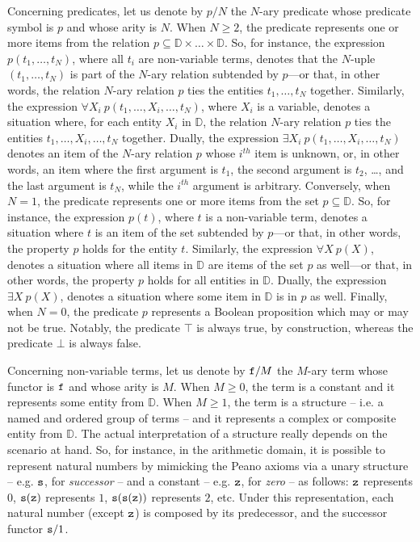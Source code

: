 \documentclass[12pt,a4paper,openright,twoside]{book}
\begin{document}
Concerning predicates, let us denote by $p/N$ the $N$-ary predicate whose predicate symbol is $p$ and whose arity is $N$.
%
%
When $N \geq 2$, the predicate represents one or more items from the relation $p \subseteq \mathbb{D} \times \ldots \times \mathbb{D}$.
%
So, for instance, the expression $p(t_1, \ldots, t_N)$, where all $t_i$ are non-variable terms, denotes that the $N$-uple $(t_1, \ldots, t_N)$ is part of the $N$-ary relation subtended by $p$---or that, in other words, the relation $N$-ary relation $p$ ties the entities $t_1, \ldots, t_N$ together.
%
Similarly, the expression $\forall X_i\ p(t_1, \ldots, X_i, \ldots, t_N)$, where $X_i$ is a variable, denotes a situation where, for each entity $X_i$ in $\mathbb{D}$, the relation $N$-ary relation $p$ ties the entities $t_1, \ldots, X_i, \ldots, t_N$ together.
%
Dually, the expression $\exists X_i\ p(t_1, \ldots, X_i, \ldots, t_N)$ denotes an item of the $N$-ary relation $p$ whose $i^{th}$ item is unknown, or, in other words, an item where the first argument is $t_1$, the second argument is $t_2$, \ldots, and the last argument is $t_N$, while the $i^{th}$ argument is arbitrary.
%
Conversely, when $N = 1$, the predicate represents one or more items from the set $p \subseteq \mathbb{D}$.
%
So, for instance, the expression $p(t)$, where $t$ is a non-variable term, denotes a situation where $t$ is an item of the set subtended by $p$---or that, in other words, the property $p$ holds for the entity $t$.
%
Similarly, the expression $\forall X\ p(X)$, denotes a situation where all items in $\mathbb{D}$ are items of the set $p$ as well---or that, in other words, the property $p$ holds for all entities in $\mathbb{D}$.
%
Dually, the expression $\exists X\ p(X)$, denotes a situation where some item in $\mathbb{D}$ is in $p$ as well.
%
Finally, when $N = 0$, the predicate $p$ represents a Boolean proposition which may or may not be true.
%
Notably, the predicate $\top$ is always true, by construction, whereas the predicate $\bot$ is always false.

Concerning non-variable terms, let us denote by $\mathtt{f}/M$ the $M$-ary term whose functor is $\mathtt{f}$ and whose arity is $M$.
%
When $M \geq 0$, the term is a constant and it represents some entity from $\mathbb{D}$.
%
When $M \geq 1$, the term is a structure -- i.e. a named and ordered group of terms -- and it represents a complex or composite entity from $\mathbb{D}$.
%
The actual interpretation of a structure really depends on the scenario at hand.
%
So, for instance, in the arithmetic domain, it is possible to represent natural numbers by mimicking the Peano axioms\footnotemark{} via a unary structure -- e.g. $\mathtt{s}$, for \emph{successor} -- and a constant -- e.g. $\mathtt{z}$, for \emph{zero} -- as follows:
$\mathtt{z}$ represents $0$,
$\mathtt{s}(\mathtt{z})$ represents $1$,
$\mathtt{s}(\mathtt{s}(\mathtt{z}))$ represents $2$, etc.
%
Under this representation, each natural number (except $\mathtt{z}$) is composed by its predecessor, and the successor functor $\mathtt{s}/1$.
\end{document}
